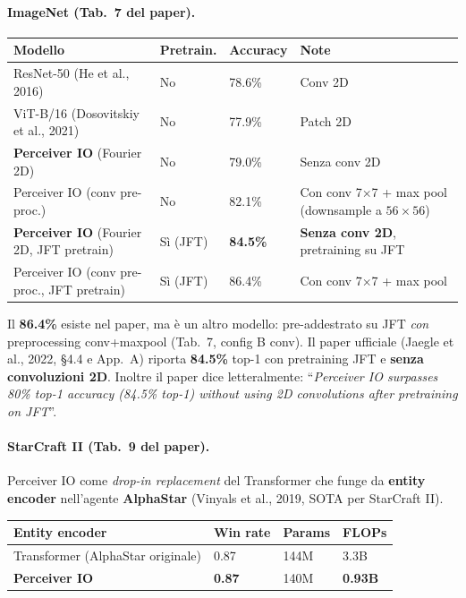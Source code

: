 \documentclass[
  11pt,
]{article}
\begin{document}
\paragraph{ImageNet (Tab.\ 7 del paper).}

{\small
\begin{longtable}{@{}p{5cm} p{2cm} p{2.2cm} p{2cm}@{}}
\toprule
\textbf{Modello} & \textbf{Pretrain.} & \textbf{Accuracy} & \textbf{Note} \\
\midrule
\endhead
ResNet-50 (He et al., 2016) & No & 78.6\% & Conv 2D \\[2pt]
ViT-B/16 (Dosovitskiy et al., 2021) & No & 77.9\% & Patch 2D \\[2pt]
\textbf{Perceiver IO} (Fourier 2D) & No & 79.0\% & Senza conv 2D \\[2pt]
Perceiver IO (conv pre-proc.) & No & 82.1\% & Con conv 7$\times$7 + max pool (downsample a $56\times56$) \\[2pt]
\textbf{Perceiver IO} (Fourier 2D, JFT pretrain) & Sì (JFT) & \textbf{84.5\%} & \textbf{Senza conv 2D}, pretraining su JFT \\[2pt]
Perceiver IO (conv pre-proc., JFT pretrain) & Sì (JFT) & 86.4\% & Con conv 7$\times$7 + max pool \\
\bottomrule
\end{longtable}
}

\begin{notabox}[title={\textbf{Nota su ``86.4\%'' di ImageNet IO}}]
Il \textbf{86.4\%} esiste nel paper, ma è un altro modello: pre-addestrato su JFT \emph{con} preprocessing conv+maxpool (Tab.~7, config B conv). Il paper ufficiale (Jaegle et al., 2022, \S4.4 e App.\ A) riporta \textbf{84.5\%} top-1 con pretraining JFT e \textbf{senza convoluzioni 2D}. Inoltre il paper dice letteralmente: ``\emph{Perceiver IO surpasses 80\% top-1 accuracy (84.5\% top-1) without using 2D convolutions after pretraining on JFT}''.
\end{notabox}

\paragraph{StarCraft II (Tab.\ 9 del paper).} Perceiver IO come \emph{drop-in replacement} del Transformer che funge da \textbf{entity encoder} nell'agente \textbf{AlphaStar} (Vinyals et al., 2019, SOTA per StarCraft II).

{\small
\begin{longtable}{@{}p{3.5cm} p{2cm} p{2cm} p{2cm}@{}}
\toprule
\textbf{Entity encoder} & \textbf{Win rate} & \textbf{Params} & \textbf{FLOPs} \\
\midrule
\endhead
Transformer (AlphaStar originale) & 0.87 & 144M & 3.3B \\[2pt]
\textbf{Perceiver IO} & \textbf{0.87} & 140M & \textbf{0.93B} \\
\bottomrule
\end{longtable}
}
\end{document}
